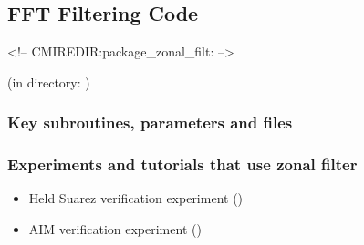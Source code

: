 \subsection{FFT Filtering Code}
\label{sec:zonal_filt}
\begin{rawhtml}
<!-- CMIREDIR:package_zonal_filt: -->
\end{rawhtml}
\begin{center}
(in directory: )
\end{center}

\subsubsection{Key subroutines, parameters and files}
\label{sec:pkg:zonal_filt:implementation_synopsis}

\subsubsection{Experiments and tutorials that use zonal filter}
\label{sec:pkg:zonal_filt:experiments}

\begin{itemize}
\item Held Suarez verification experiment ()

\item AIM verification experiment ()

\end{itemize}

